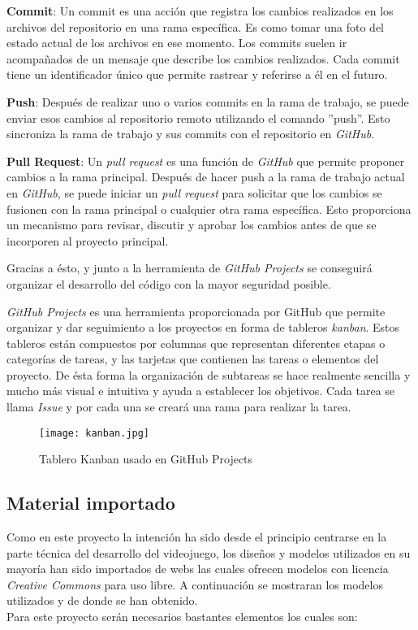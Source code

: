 \textbf{Commit}: Un commit es una acción que registra los cambios realizados en los archivos del repositorio en una rama específica. Es como tomar una foto del estado actual de los archivos en ese momento. Los commits suelen ir acompañados de un mensaje que describe los cambios realizados. Cada commit tiene un identificador único que permite rastrear y referirse a él en el futuro.

\textbf{Push}: Después de realizar uno o varios commits en la rama de trabajo, se puede enviar esos cambios al repositorio remoto utilizando el comando ''push''. Esto sincroniza la rama de trabajo y sus commits con el repositorio en \textit{GitHub}.

\textbf{Pull Request}: Un \textit{pull request} es una función de \textit{GitHub} que permite proponer cambios a la rama principal. Después de hacer push a la rama de trabajo actual en \textit{GitHub}, se puede iniciar un \textit{pull request} para solicitar que los cambios se fusionen con la rama principal o cualquier otra rama específica. Esto proporciona un mecanismo para revisar, discutir y aprobar los cambios antes de que se incorporen al proyecto principal.

Gracias a ésto, y junto a la herramienta de \textit{GitHub Projects} se conseguirá organizar el desarrollo del código con la mayor seguridad posible.

\textit{GitHub Projects} es una herramienta proporcionada por GitHub que permite organizar y dar seguimiento a los proyectos en forma de tableros \textit{kanban}. Estos tableros están compuestos por columnas que representan diferentes etapas o categorías de tareas, y las tarjetas que contienen las tareas o elementos del proyecto. De ésta forma la organización de subtareas se hace realmente sencilla y mucho más visual e intuitiva y ayuda a establecer los objetivos. Cada tarea se llama \textit{Issue} y por cada una se creará una rama para realizar la tarea. 

\begin{figure}[H]
    \centering
    \texttt{[image: kanban.jpg]}
    \caption{Tablero Kanban usado en GitHub Projects}
\end{figure}

\subsection{Material importado}

Como en este proyecto la intención ha sido desde el principio centrarse en la parte técnica del desarrollo
del videojuego, los diseños y modelos utilizados en su mayoría han sido importados de webs las cuales
ofrecen modelos con licencia \textit{Creative Commons} para uso libre. A continuación se mostraran los modelos utilizados 
y de donde se han obtenido.\\
Para este proyecto serán necesarios bastantes elementos los cuales son:

